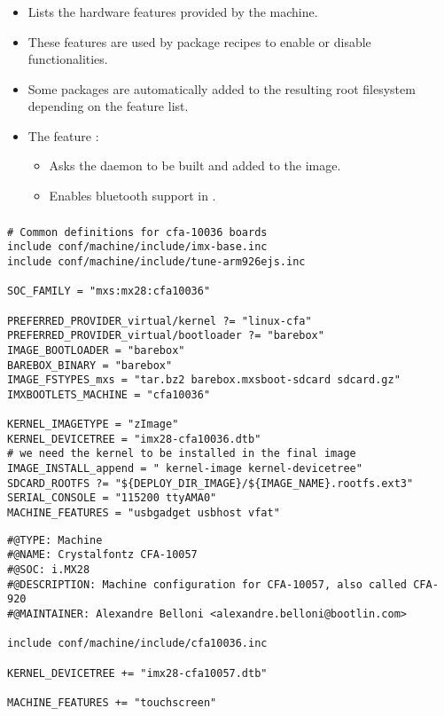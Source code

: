 \begin{frame}
  \frametitle{}
  \begin{itemize}
    \item Lists the hardware features provided by the machine.
    \item These features are used by package recipes to enable or
      disable functionalities.
    \item Some packages are automatically added to the resulting root
    filesystem depending on the feature list.
    \item The feature :
      \begin{itemize}
        \item Asks the  daemon to be built and added to
          the image.
        \item Enables bluetooth support in .
      \end{itemize}
  \end{itemize}
\end{frame}

\begin{frame}[fragile]
  \frametitle{}
  \begin{block}{}
    \begin{verbatim}
# Common definitions for cfa-10036 boards
include conf/machine/include/imx-base.inc
include conf/machine/include/tune-arm926ejs.inc

SOC_FAMILY = "mxs:mx28:cfa10036"

PREFERRED_PROVIDER_virtual/kernel ?= "linux-cfa"
PREFERRED_PROVIDER_virtual/bootloader ?= "barebox"
IMAGE_BOOTLOADER = "barebox"
BAREBOX_BINARY = "barebox"
IMAGE_FSTYPES_mxs = "tar.bz2 barebox.mxsboot-sdcard sdcard.gz"
IMXBOOTLETS_MACHINE = "cfa10036"

KERNEL_IMAGETYPE = "zImage"
KERNEL_DEVICETREE = "imx28-cfa10036.dtb"
# we need the kernel to be installed in the final image
IMAGE_INSTALL_append = " kernel-image kernel-devicetree"
SDCARD_ROOTFS ?= "${DEPLOY_DIR_IMAGE}/${IMAGE_NAME}.rootfs.ext3"
SERIAL_CONSOLE = "115200 ttyAMA0"
MACHINE_FEATURES = "usbgadget usbhost vfat"
    \end{verbatim}
  \end{block}
\end{frame}

\begin{frame}[fragile]{}
  \begin{block}{}
    \begin{verbatim}
#@TYPE: Machine
#@NAME: Crystalfontz CFA-10057
#@SOC: i.MX28
#@DESCRIPTION: Machine configuration for CFA-10057, also called CFA-920
#@MAINTAINER: Alexandre Belloni <alexandre.belloni@bootlin.com>

include conf/machine/include/cfa10036.inc

KERNEL_DEVICETREE += "imx28-cfa10057.dtb"

MACHINE_FEATURES += "touchscreen"
    \end{verbatim}
  \end{block}
\end{frame}

